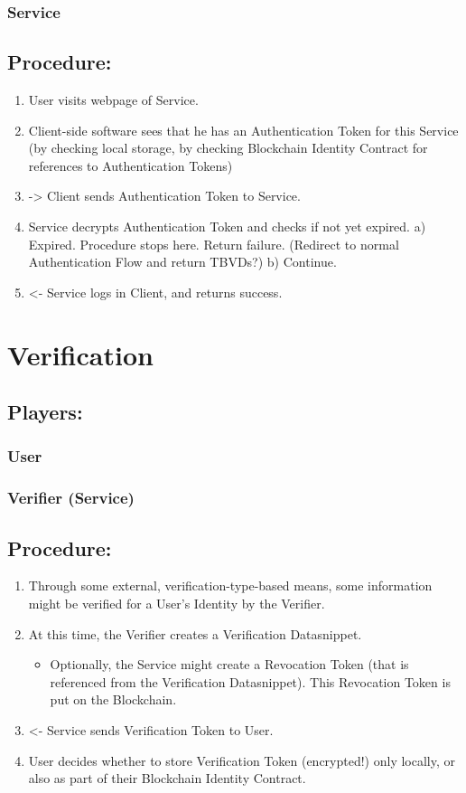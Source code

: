 \documentclass[11pt]{article}
\begin{document}
\subsubsection{Service}
\label{sec:org58d9287}
\subsection{Procedure:}
\label{sec:org3e23538}
\begin{enumerate}
\item User visits webpage of Service.
\item Client-side software sees that he has an Authentication Token for this Service (by checking local storage, by checking Blockchain Identity Contract for references to Authentication Tokens)
\item -> Client sends Authentication Token to Service.
\item Service decrypts Authentication Token and checks if not yet expired.
a) Expired. Procedure stops here. Return failure. (Redirect to normal Authentication Flow and return TBVDs?)
b) Continue.
\item <- Service logs in Client, and returns success.
\end{enumerate}

\section{Verification}
\label{sec:org9b52712}
\subsection{Players:}
\label{sec:orga9480c6}
\subsubsection{User}
\label{sec:orga4f7662}
\subsubsection{Verifier (Service)}
\label{sec:org6870408}
\subsection{Procedure:}
\label{sec:orgd06decc}
\begin{enumerate}
\item Through some external, verification-type-based means, some information might be verified for a User's Identity by the Verifier.
\item At this time, the Verifier creates a Verification Datasnippet.
\begin{itemize}
\item Optionally, the Service might create a Revocation Token (that is referenced from the Verification Datasnippet). This Revocation Token is put on the Blockchain.
\end{itemize}
\item <- Service sends Verification Token to User.
\item User decides whether to store Verification Token (encrypted!) only locally, or also as part of their Blockchain Identity Contract.
\end{enumerate}
\end{document}
